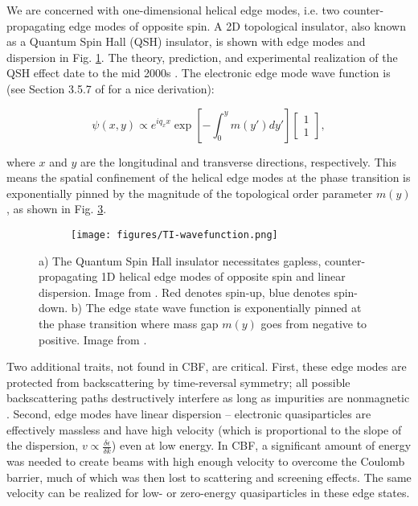 \documentclass[onecolumn,
               superscriptaddress,
               floatfix,
               longbibliography, 
               showkeys,apl]{revtex4-2}
\begin{document}
\begin{appendices}
We are concerned with one-dimensional helical edge modes, i.e. two counter-propagating edge modes of opposite spin. A 2D topological insulator, also known as a Quantum Spin Hall (QSH) insulator, is shown with edge modes and dispersion in Fig. \ref{subfig:QSH}. The theory, prediction, and experimental realization of the QSH effect date to the mid 2000s \cite{PhysRevLett.95.146802,PhysRevLett.95.226801,doi:10.1126/science.1133734,doi:10.1126/science.1148047}. The electronic edge mode wave function is (see Section 3.5.7 of \cite{FRUCHART2013779} for a nice derivation):

\begin{equation}
    \psi (x,y) \propto e^{iq_xx} \exp \left[-\int_{0}^{y} m(y') dy'\right] \begin{bmatrix}1 \\ 1\end{bmatrix},
\label{eq:tiwavefunction}
\end{equation}

where $x$ and $y$ are the longitudinal and transverse directions, respectively. This means the spatial confinement of the helical edge modes at the phase transition is exponentially pinned by the magnitude of the topological order parameter $m(y)$, as shown in Fig. \ref{subfig:TI-wavefunction}.

\begin{figure}[H]
\begin{subfigure}{.5\textwidth}
    \centering
    \caption{}    
    \label{subfig:QSH}
\end{subfigure}
\begin{subfigure}{.5\textwidth}
    \centering
    \texttt{[image: figures/TI-wavefunction.png]}
    \caption{}
    \label{subfig:TI-wavefunction}
\end{subfigure}
\caption{a) The Quantum Spin Hall insulator necessitates gapless, counter-propagating 1D helical edge modes of opposite spin and linear dispersion. Image from \cite{RevModPhys.83.1057}. Red denotes spin-up, blue denotes spin-down. b) The edge state wave function is exponentially pinned at the phase transition where mass gap $m(y)$ goes from negative to positive. Image from \cite{FRUCHART2013779}.}
\end{figure}

Two additional traits, not found in CBF, are critical. First, these edge modes are protected from backscattering by time-reversal symmetry; all possible backscattering paths destructively interfere as long as impurities are nonmagnetic \cite{RevModPhys.83.1057}. Second, edge modes have linear dispersion -- electronic quasiparticles are effectively massless and have high velocity (which is proportional to the slope of the dispersion, $v \propto \frac{\delta\epsilon}{\delta k}$) even at low energy. In CBF, a significant amount of energy was needed to create beams with high enough velocity to overcome the Coulomb barrier, much of which was then lost to scattering and screening effects. The same velocity can be realized for low- or zero-energy quasiparticles in these edge states.



\end{appendices}
\end{document}
